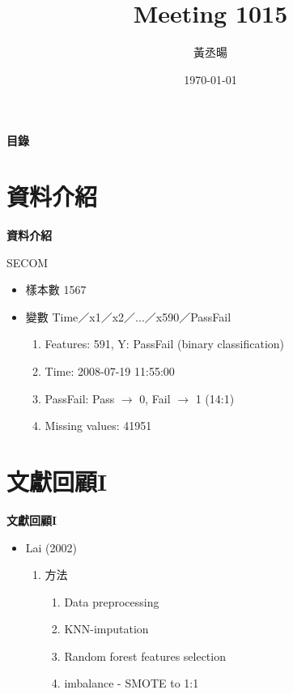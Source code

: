 \documentclass[12pt,aspectratio=43]{beamer}
\title{Meeting 1015}
\author{黃丞暘}
\institute{國立東華大學應數統計所}
\date{\today}
\begin{document}
\begin{frame}
  \titlepage
\end{frame}

\begin{frame}{\textbf{目錄}}
  \tableofcontents
\end{frame}

\section{資料介紹}
\linespread{1}  %
\begin{frame}[<+>]{\textbf{資料介紹}} %
\linespread{1.5} %

    SECOM
	
    \bigskip 
	 
	
    \begin{itemize}[] %
      \item 樣本數 1567
      \item 變數 Time／x1／x2／...／x590／PassFail
        \begin{enumerate}[] %
          \item Features: 591, Y: PassFail (binary classification)
          \item Time: 2008-07-19 11:55:00
          \item PassFail: Pass $\to$ 0, Fail $\to$ 1 (14:1)
          \item Missing values: 41951
        \end{enumerate}
    \end{itemize}
\end{frame}


\section{文獻回顧I}
\linespread{1}

\begin{frame}[<+>]{\textbf{文獻回顧I}}
\linespread{1.5}
  \begin{itemize}
    \item Lai (2002)
    \begin{enumerate}
      \item 方法
      \begin{enumerate}
        \item Data preprocessing
        \item KNN-imputation
        \item Random forest features selection
        \item imbalance - SMOTE to 1:1
      \end{enumerate}
    \end{enumerate}
  \end{itemize}
\end{frame}
\end{document}

